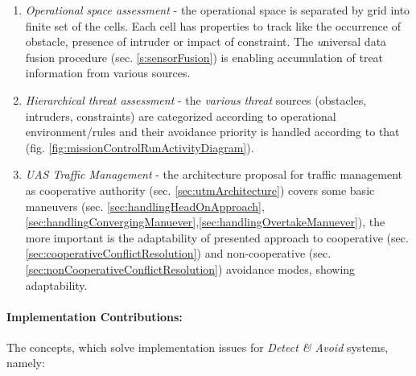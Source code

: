 \begin{enumerate}
    \item \emph{Operational space assessment} - the operational space is separated by grid into finite set of the cells. Each cell has properties to track like the occurrence of obstacle, presence of intruder or impact of constraint. The \emph universal data fusion procedure (sec. \ref{s:sensorFusion}) is enabling accumulation of treat information from various sources.
    
    \item \emph{Hierarchical threat assessment} -  the \emph{various threat} sources (obstacles, intruders, constraints) are categorized according to operational environment/rules and their avoidance priority is handled according to that (fig. \ref{fig:missionControlRunActivityDiagram}).
    
    \item \emph{UAS Traffic Management} - the architecture proposal for traffic management  as cooperative authority (sec. \ref{sec:utmArchitecture}) covers some basic maneuvers (sec. \ref{sec:handlingHeadOnApproach}, \ref{sec:handlingConvergingManuever},\ref{sec:handlingOvertakeManuever}), the more important is the adaptability of presented approach to cooperative (sec. \ref{sec:cooperativeConflictResolution}) and non-cooperative (sec. \ref{sec:nonCooperativeConflictResolution}) avoidance modes, showing adaptability. 
\end{enumerate}

\paragraph{Implementation Contributions:} The concepts, which solve implementation issues for \emph{Detect \& Avoid} systems, namely:

